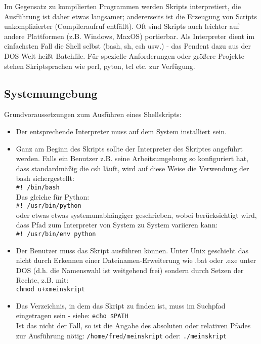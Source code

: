 \documentclass[11pt]{article}
\begin{document}
Im Gegensatz zu kompilierten Programmen werden Skripts interpretiert,
die Ausführung ist daher etwas langsamer; andererseits ist die
Erzeugung von Scripts unkomplizierter (Compileraufruf entfällt). Oft
sind Skripts auch leichter auf andere Plattformen (z.B. Windows,
MaxOS) portierbar. Als Interpreter dient im einfachsten Fall die Shell
selbst (bash, sh, csh usw.) - das Pendent dazu aus der DOS-Welt heißt
Batchfile. Für spezielle Anforderungen oder größere Projekte stehen
Skriptsprachen wie perl, pyton, tcl etc. zur Verfügung.

\subsection{Systemumgebung}
Grundvoraussetzungen zum Ausführen eines Shellskripts:
\begin{itemize}
\item Der entsprechende Interpreter muss auf dem System installiert sein.
\item Ganz am Beginn des Skripts sollte der Interpreter des Skriptes
  angeführt werden. Falls ein Benutzer z.B. seine Arbeitsumgebung so
  konfiguriert hat, dass standardmäßig die csh läuft, wird auf diese
  Weise die Verwendung der bash sichergestellt:\\
  \texttt{\#! /bin/bash}\\
  Das gleiche für Python: \\
  \texttt{\#! /usr/bin/python}\\
  oder etwas etwas systemunabhängiger geschrieben, wobei berücksichtigt wird, dass Pfad zum Interpreter von   System zu System variieren kann: \\
  \texttt{\#! /usr/bin/env python}\\
\item Der Benutzer muss das Skript ausführen können. Unter Unix
  geschieht das nicht durch Erkennen einer Dateinamen-Erweiterung wie
  .bat oder .exe unter DOS (d.h. die Namenswahl ist weitgehend frei)
  sondern durch Setzen der Rechte, z.B. mit: \\
  \texttt{chmod u+xmeinskript}
\item Das Verzeichnis, in dem das Skript zu finden ist, muss im
  Suchpfad eingetragen sein - siehe: 
  \texttt{echo \$PATH}\\
  Ist das nicht der Fall, so ist die Angabe des absoluten oder
  relativen Pfades zur Ausführung nötig:
  \texttt{/home/fred/meinskript}
  oder:
  \texttt{./meinskript}
\end{itemize}
\end{document}

